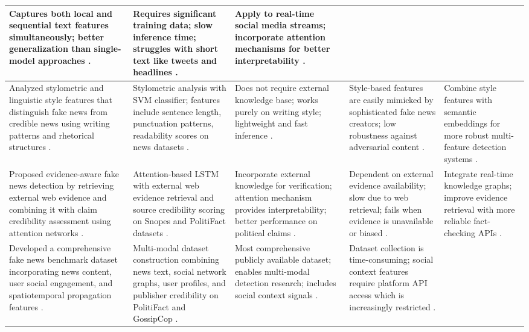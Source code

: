 \documentclass[runningheads]{llncs}
\begin{document}
\begin{longtable}{|p{}|p{}|p{}|p{}|p{}|}
Captures both local and sequential text features simultaneously; better generalization than single-model approaches \cite{Nasir2021FakeNews}. &
Requires significant training data; slow inference time; struggles with short text like tweets and headlines \cite{Nasir2021FakeNews}. &
Apply to real-time social media streams; incorporate attention mechanisms for better interpretability \cite{Nasir2021FakeNews}. \\ \hline
Analyzed stylometric and linguistic style features that distinguish fake news from credible news using writing patterns and rhetorical structures \cite{Przybyla2020Capturing}. &
Stylometric analysis with SVM classifier; features include sentence length, punctuation patterns, readability scores on news datasets \cite{Przybyla2020Capturing}. &
Does not require external knowledge base; works purely on writing style; lightweight and fast inference \cite{Przybyla2020Capturing}. &
Style-based features are easily mimicked by sophisticated fake news creators; low robustness against adversarial content \cite{Przybyla2020Capturing}. &
Combine style features with semantic embeddings for more robust multi-feature detection systems \cite{Przybyla2020Capturing}. \\ \hline
Proposed evidence-aware fake news detection by retrieving external web evidence and combining it with claim credibility assessment using attention networks \cite{Popat2019DeClarE}. &
Attention-based LSTM with external web evidence retrieval and source credibility scoring on Snopes and PolitiFact datasets \cite{Popat2019DeClarE}. &
Incorporate external knowledge for verification; attention mechanism provides interpretability; better performance on political claims \cite{Popat2019DeClarE}. &
Dependent on external evidence availability; slow due to web retrieval; fails when evidence is unavailable or biased \cite{Popat2019DeClarE}. &
Integrate real-time knowledge graphs; improve evidence retrieval with more reliable fact-checking APIs \cite{Popat2019DeClarE}. \\ \hline
Developed a comprehensive fake news benchmark dataset incorporating news content, user social engagement, and spatiotemporal propagation features \cite{Shu2020FakeNewsNet}. &
Multi-modal dataset construction combining news text, social network graphs, user profiles, and publisher credibility on PolitiFact and GossipCop \cite{Shu2020FakeNewsNet}. &
Most comprehensive publicly available dataset; enables multi-modal detection research; includes social context signals \cite{Shu2020FakeNewsNet}. &
Dataset collection is time-consuming; social context features require platform API access which is increasingly restricted \cite{Shu2020FakeNewsNet}. &

\end{longtable}
\end{document}
